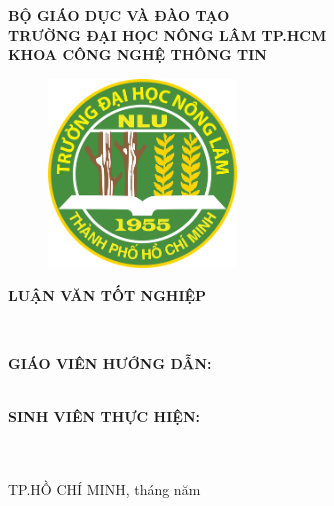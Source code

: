 \begin{titlepage}

  \begin{center}
    { \bfseries 
      BỘ GIÁO DỤC VÀ ĐÀO TẠO\\
      TRƯỜNG ĐẠI HỌC NÔNG LÂM TP.HCM\\
      KHOA CÔNG NGHỆ THÔNG TIN\\[0.5cm] }
   
    
    \begin{figure}[htp]
    \centering
    \includegraphics[width=5cm]{images/Logo_HCMUAF.png}
\end{figure}

    { \Large \bfseries LUẬN VĂN TỐT NGHIỆP\\[2cm] }

    { \Large \bfseries \MakeUppercase{\tenKL} \\[2cm] } %
    \begin{multicols}{2}
    \begin{small}
    \begin{flushleft}
    
    
     {\bfseries GIÁO VIÊN HƯỚNG DẪN:\\
    \MakeUppercase{\tenGVHD} \\[1cm]}

    { \bfseries SINH VIÊN THỰC HIỆN:\\
    \MakeUppercase{\tenSVa\\\tenSVb} \\[1cm] }
   \end{flushleft}
    \end{small}
    \end{multicols}

    
    \vfill
    TP.HỒ CHÍ MINH, tháng \hspace*{1cm} năm     
  \end{center}
  
\end{titlepage}